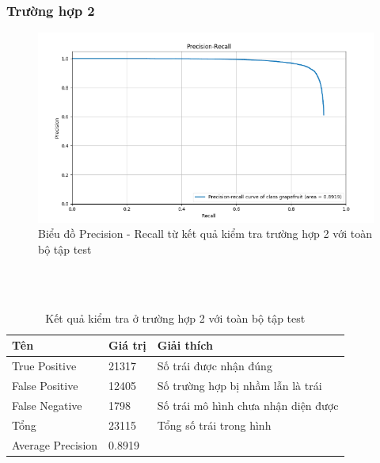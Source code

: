 \subsubsection{Trường hợp 2}
\begin{center}
    \begin{figure}[H]
    \centering
    \includegraphics[width=0.9\columnwidth]{images/chap3/PR_curve.png}
    \caption{Biểu đồ Precision - Recall từ kết quả kiểm tra trường hợp 2 với toàn bộ tập test}
    \label{fig:my_label}
    \end{figure}
\end{center}
~\\
~\\
\begin{table}[H]
    \begin{tabular}{p{4cm}  p{2.5cm}  p{5.5cm} }
    \hline		
	Tên & Giá trị & Giải thích \\
	\hline
	True Positive & 21317 & Số trái được nhận đúng \\
	False Positive & 12405  & Số trường hợp bị nhầm lẫn là trái \\
	False Negative & 1798 & Số trái mô hình chưa nhận diện được \\

    \hline
    Tổng & 23115 & Tổng số trái trong hình \\
    
    \hline
	Average Precision & 0.8919\\
	\hline
	\end{tabular}
	\caption{Kết quả kiểm tra ở trường hợp 2 với toàn bộ tập test}
    \label{chap3:case2:table02}    
\end{table}
